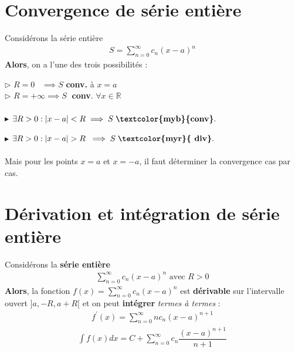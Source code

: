 \documentclass{report}
\begin{document}
\begin{multicols*}{3}
    \vspace{-1.5em}
    \section{Convergence de série entière}
    \vspace{-0.5em}
        Considérons la série entière 
        \begin{align*}
           S = \sum_{n=0}^{\infty }c_n(x - a)^n 
        \end{align*}
        \textbf{Alors}, on a l'une des trois possibilités : 

            \noindent$\rhd$
                $R = 0 \;\;\; \implies S$ \; 
                \textcolor{myb}{\textbf{conv.}}  à $x = a$ 
            \\
            $\rhd$  $R = +\infty \implies S \;$ 
            \textcolor{myb}{\textbf{conv}}. 
            \; $\forall x \in \mathbb{R}$  
            \\ \\
            $\blacktriangleright$ 
            $\exists R > 0 : |x - a| < R \implies  S \; \textbf{\textcolor{myb}{conv}}.$

            \noindent 
            $\blacktriangleright$ $\exists R > 0 : |x - a| > R \; \implies  S \;
            \textbf{\textcolor{myr}{ div}}.$   
            \\\\ 
            Mais pour les points $x = a$ et $x = -a$, il faut déterminer  
            la convergence cas par cas. 


    \vspace{-1em}
    \section{Dérivation et intégration de série entière}
    \vspace{-2em}
        Considérons la \textbf{série entière} 
        \begin{align*}
            \sum\limits_{n = 0}^{\infty}c_n(x - a)^n \text{ avec } R > 0
        \end{align*}                
        \textbf{Alors}, la fonction $f(x) =  \sum_{n=0}^{\infty }c_n(x - a)^n$ 
        est \textbf{\textcolor{myb}{dérivable}} 
        sur l'intervalle ouvert $]a, -R, a + R[$ et on peut 
        \textcolor{myb}{\textbf{intégrer}}    \textit{termes à termes} :  
        \begin{align*}
            f^{\prime}(x) = \sum_{n=0}^{\infty }nc_n(x - a)^{n + 1}
        \end{align*}
        \vspace{-1em} 
        \begin{align*}
            \int f(x)dx  = C + \sum_{n=0}^{\infty }c_n
            \dfrac{(x - a)^{n+1}}{n+1} 
        \end{align*}    




\end{multicols*}
\end{document}
